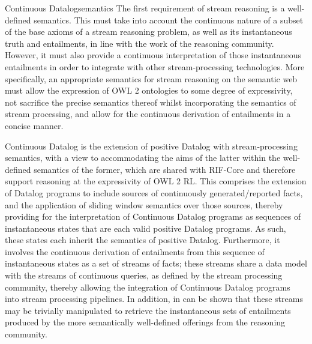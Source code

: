 \begin{nestedsection}{Continuous Datalog}{semantics}
	The first requirement of stream reasoning is a well-defined semantics.
	This must take into account the continuous nature of a subset of the base axioms of a stream reasoning problem, as well as its instantaneous truth and entailments, in line with the work of the reasoning community.
	However, it must also provide a continuous interpretation of those instantaneous entailments in order to integrate with other stream-processing technologies.
	More specifically, an appropriate semantics for stream reasoning on the semantic web must allow the expression of OWL 2 ontologies to some degree of expressivity, not sacrifice the precise semantics thereof whilst incorporating the semantics of stream processing, and allow for the continuous derivation of entailments in a concise manner.

	Continuous Datalog is the extension of positive Datalog with stream-processing semantics, with a view to accommodating the aims of the latter within the well-defined semantics of the former, which are shared with RIF-Core and therefore support reasoning at the expressivity of OWL 2 RL.
	This comprises the extension of Datalog programs to include sources of continuously generated/reported facts, and the application of sliding window semantics over those sources, thereby providing for the interpretation of Continuous Datalog programs as sequences of instantaneous states that are each valid positive Datalog programs.
	As such, these states each inherit the semantics of positive Datalog.
	Furthermore, it involves the continuous derivation of entailments from this sequence of instantaneous states as a set of streams of facts;
	these streams share a data model with the streams of continuous queries, as defined by the stream processing community, thereby allowing the integration of Continuous Datalog programs into stream processing pipelines.
	In addition, in can be shown that these streams may be trivially manipulated to retrieve the instantaneous sets of entailments produced by the more semantically well-defined offerings from the reasoning community.


\end{nestedsection}
